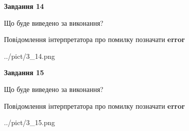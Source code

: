\documentclass[11pt, ukrainian]{article}
\begin{document}
{\begin {large}
{\begin {center}\textbf{Завдання 14}\end {center}}\par
Що буде виведено за виконання? \par
Повідомлення інтерпретатора про помилку позначати \textbf{error}

\begin{center}
	{../pict/3_14.png}
\end{center}
\newpage

{\begin {center}\textbf{Завдання 15}\end {center}}\par
Що буде виведено за виконання? \par
Повідомлення інтерпретатора про помилку позначати \textbf{error}

\begin{center}
	{../pict/3_15.png}
\end{center}
\newpage

\end {large}}
\end{document}
